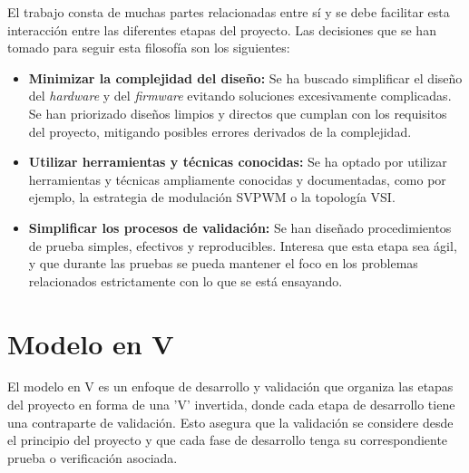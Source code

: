 El trabajo consta de muchas partes relacionadas entre sí y se debe facilitar esta interacción entre las diferentes etapas del proyecto. Las decisiones que se han tomado para seguir esta filosofía son los siguientes:

\begin{itemize}
	\item \textbf{Minimizar la complejidad del diseño:} Se ha buscado simplificar el diseño del \textit{hardware} y del \textit{firmware} evitando soluciones excesivamente complicadas. Se han priorizado diseños limpios y directos que cumplan con los requisitos del proyecto, mitigando posibles errores derivados de la complejidad.
	
	\item \textbf{Utilizar herramientas y técnicas conocidas:} Se ha optado por utilizar herramientas y técnicas ampliamente conocidas y documentadas, como por ejemplo, la estrategia de modulación SVPWM o la topología VSI.
	
	\item \textbf{Simplificar los procesos de validación:} Se han diseñado procedimientos de prueba simples, efectivos y reproducibles. Interesa que esta etapa sea ágil, y que durante las pruebas se pueda mantener el foco en los problemas relacionados estrictamente con lo que se está ensayando.
	
\end{itemize}


\section{Modelo en V}
El modelo en V es un enfoque de desarrollo y validación que organiza las etapas del proyecto en forma de una 'V' invertida, donde cada etapa de desarrollo tiene una contraparte de validación. Esto asegura que la validación se considere desde el principio del proyecto y que cada fase de desarrollo tenga su correspondiente prueba o verificación asociada.

